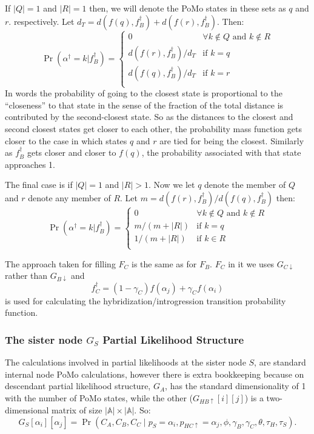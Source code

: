 \documentclass{article}
\begin{document}
If $|Q| = 1$ and $|R| = 1$ then, we will denote the PoMo states in these sets as $q$ and $r$. respectively.
Let $d_T = d\left(f(q), f^{\dag}_B\right) +  d\left(f(r), f^{\dag}_B\right)$. Then:
\begin{equation}
    \Pr\left(\alpha^{\dag}=k | f^{\dag}_B\right)= \left\{
  \begin{array}{ll}
   0 & \forall k \notin Q \mbox{ and }  k \notin R \\
   d(f(r),f^{\dag}_B)/d_T  & \mbox{if } k=q  \\
   d(f(q),f^{\dag}_B)/d_T & \mbox{if } k=r \\
   \end{array}\right.
\end{equation}
In words the probability of going to the closest state is proportional to the ``closeness'' to that state in the sense of the fraction of the total distance is contributed by the second-closest state.
So as the distances  to the closest and second closest states get closer to each other, the probability mass function gets closer to the case in which states $q$ and $r$ are tied for being the closest.
Similarly as $f^{\dag}_B$ gets closer and closer to $f(q)$, the probability associated with that state approaches 1.

The final case is if $|Q| = 1$ and $|R| > 1$. 
Now we let $q$ denote the member of $Q$ and $r$ denote any member of $R$.
Let $m=d(f(r),f^{\dag}_B)/d(f(q),f^{\dag}_B)$ then:
\begin{equation}
    \Pr\left(\alpha^{\dag}=k | f^{\dag}_B\right)= \left\{
  \begin{array}{ll}
   0 & \forall k \notin Q \mbox{ and }  k \notin R \\
   m/(m+|R|)  & \mbox{if } k=q  \\
   1/(m+|R|) & \mbox{if } k\in R \\
   \end{array}\right.
\end{equation}

The approach taken for filling $F_C$ is the same as for $F_B$.
$F_C$ in it  we uses $G_{C\downarrow}$ rather than $G_{B\downarrow}$ and
\begin{equation}
f^{\dag}_C = \left(1-\gamma_C\right) f(\alpha_j) + \gamma_C f(\alpha_i)
\end{equation}
is used for calculating the hybridization/introgression transition probability function.

\subsubsection{The sister node $G_S$ Partial Likelihood Structure}
The calculations involved in partial likelihoods at the sister node $S$, are standard internal node PoMo calculations, however there is extra bookkeeping because on descendant partial likelihood structure, $G_A$, has
the standard dimensionality of 1 with the number of PoMo states, while the other ($G_{HB\uparrow}[i][j]$) is a two-dimensional matrix of size $|\mathbb{A}|\times |\mathbb{A}|$.
So:
$$G_{S}[\alpha_i][\alpha_j] = \Pr\left(C_A, C_B, C_C\mid p_S=\alpha_i, p_{HC\uparrow}=\alpha_j, \phi, \gamma_B, \gamma_C, \theta, \tau_H, \tau_S\right).$$
\end{document}
